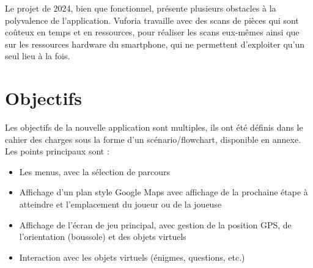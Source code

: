 Le projet de 2024, bien que fonctionnel, présente plusieurs obstacles à la polyvalence de l'application. Vuforia
travaille avec des scans de pièces qui sont coûteux en temps et en ressources, pour réaliser les scans
eux-mêmes ainsi que sur les ressources hardware du smartphone, qui ne permettent d'exploiter qu'un seul lieu
à la fois.

\section{Objectifs}

Les objectifs de la nouvelle application sont multiples, ils ont été définis dans le cahier des charges sous la forme d'un
scénario/flowchart, disponible en annexe. Les points principaux sont :
\begin{itemize}[label=\textbullet]
    \item Les menus, avec la sélection de parcours
    \item Affichage d'un plan style Google Maps avec affichage de la prochaine étape à atteindre et l'emplacement du joueur ou de la joueuse
    \item Affichage de l'écran de jeu principal, avec gestion de la position GPS, de l'orientation (boussole) et des objets virtuels
    \item Interaction avec les objets virtuels (énigmes, questions, etc.)
\end{itemize}




